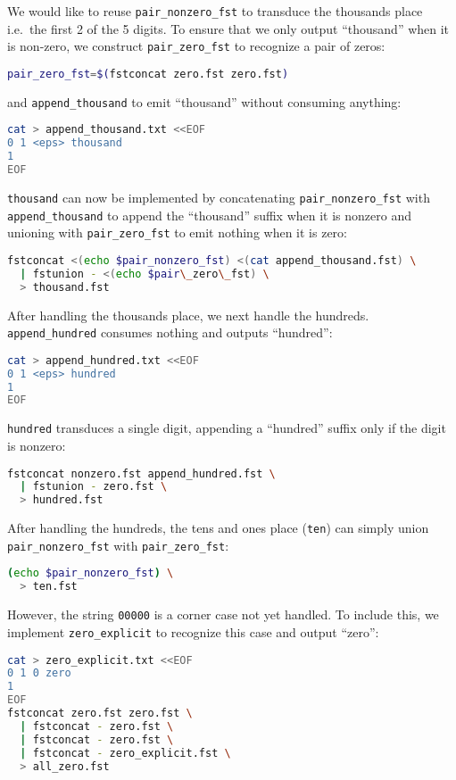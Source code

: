 \documentclass[a4paper,oneside,reqno]{amsart}
\begin{document}
\begin{enumerate}[label=\arabic*.]
    We would like to reuse \texttt{pair\_nonzero\_fst} to transduce the thousands place i.e.\
    the first 2 of the 5 digits. To ensure that we only output ``thousand'' when it is non-zero,
    we construct \texttt{pair\_zero\_fst} to recognize a pair of zeros:
    \begin{lstlisting}[language=bash]
pair_zero_fst=$(fstconcat zero.fst zero.fst)
    \end{lstlisting}
    and \texttt{append\_thousand} to emit ``thousand'' without consuming anything:
    \begin{lstlisting}[language=bash]
cat > append_thousand.txt <<EOF
0 1 <eps> thousand
1
EOF
    \end{lstlisting}
    \texttt{thousand} can now be implemented by concatenating
    \texttt{pair\_nonzero\_fst} with \texttt{append\_thousand}
    to append the ``thousand'' suffix when it is nonzero and
    unioning with \texttt{pair\_zero\_fst} to emit nothing
    when it is zero:
    \begin{lstlisting}[language=bash]
fstconcat <(echo $pair_nonzero_fst) <(cat append_thousand.fst) \
  | fstunion - <(echo $pair\_zero\_fst) \
  > thousand.fst
    \end{lstlisting}

    After handling the thousands place, we next handle the hundreds. \texttt{append\_hundred}
    consumes nothing and outputs ``hundred'':
    \begin{lstlisting}[language=bash]
cat > append_hundred.txt <<EOF
0 1 <eps> hundred
1
EOF
    \end{lstlisting}
    \texttt{hundred} transduces a single digit, appending a ``hundred'' suffix only if
    the digit is nonzero:
    \begin{lstlisting}[language=bash]
fstconcat nonzero.fst append_hundred.fst \
  | fstunion - zero.fst \
  > hundred.fst
    \end{lstlisting}

    After handling the hundreds, the tens and ones place (\texttt{ten}) can
    simply union \texttt{pair\_nonzero\_fst} with \texttt{pair\_zero\_fst}:
    \begin{lstlisting}[language=bash]
(echo $pair_nonzero_fst) \
  > ten.fst
    \end{lstlisting}

    However, the string \texttt{00000} is a corner case not yet handled. To include
    this, we implement \texttt{zero\_explicit} to recognize this case and output
    ``zero'':
    \begin{lstlisting}[language=bash]
cat > zero_explicit.txt <<EOF
0 1 0 zero
1
EOF
fstconcat zero.fst zero.fst \
  | fstconcat - zero.fst \
  | fstconcat - zero.fst \
  | fstconcat - zero_explicit.fst \
  > all_zero.fst
    \end{lstlisting}


\end{enumerate}
\end{document}
